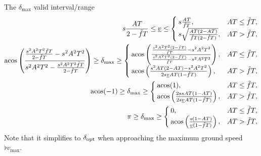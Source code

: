 The $\delta_{\max}$ valid interval/range
\begin{align*}
s \frac{AT}{2 - \tilde{f}T} \le \flat{v} \le
\begin{cases}
s \frac{AT}{\tilde{f}T}, & AT \le \tilde{f}T,\\
s \sqrt{\frac{AT(2 - AT)}{\tilde{f}T(2 - \tilde{f}T)}}, &AT > \tilde{f}T,
\end{cases}\\
\acos\left( \frac{\frac{s^2A^2T^2\tilde{f}T}{2 - \tilde{f}T} - s^2A^2T^2}{s^2A^2T^2 - \frac{s^2A^2T^2\tilde{f}T}{2 - \tilde{f}T}} \right) \ge \delta_{\max} \ge
\begin{cases}
\acos\left( \frac{\frac{s^2A^2T^2(2 - \tilde{f}T)}{\tilde{f}T} - s^2A^2T^2}{\frac{s^2A^2T^2(2 - \tilde{f}T)}{\tilde{f}T} - s^2A^2T^2} \right), & AT \le \tilde{f}T,\\
\acos\left( \frac{s^2 AT(2 - AT) - s^2 A^2 T^2}{2 s \flat{v} AT(1 - \tilde{f}T)} \right), &AT > \tilde{f}T,
\end{cases}\\
\acos(-1) \ge \delta_{\max} \ge
\begin{cases}
\acos(1), & AT \le \tilde{f}T,\\
\acos\left( \frac{2 s s AT(1 - AT)}{2 s \flat{v} AT(1 - \tilde{f}T)} \right), &AT > \tilde{f}T,
\end{cases}\\
\pi \ge \delta_{\max} \ge
\begin{cases}
0, & AT \le \tilde{f}T,\\
\acos\left( \frac{s(1 - AT)}{\flat{v} (1 - \tilde{f}T)} \right), &AT > \tilde{f}T,
\end{cases}
\end{align*}
Note that it simplifies to $\delta_{\operatorname{opt}}$ when approaching the maximum ground speed $\flat{v}_{\max}$.


